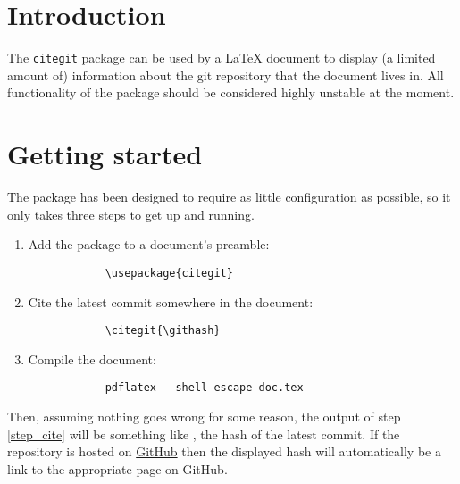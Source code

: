 \documentclass[12pt,a4paper]{article}
\begin{document}
	\section*{Introduction}
	The \verb+citegit+ package can be used by a \LaTeX{} document to display
	(a limited amount of) information about the git repository that the document
	lives in. All functionality of the package should be considered highly
	unstable at the moment.
	\section*{Getting started}
	The package has been designed to require as little configuration as possible,
	so it only takes three steps to get up and running.
	\begin{enumerate}
		\item
		\label{step_package}
		Add the package to a document's preamble:
		\begin{verbatim}
			\usepackage{citegit}
		\end{verbatim}
		\item
		\label{step_cite}
		Cite the latest commit somewhere in the document:
		\begin{verbatim}
			\citegit{\githash}
		\end{verbatim}
		\item
		\label{step_compile}
		Compile the document:
		\begin{verbatim}
			pdflatex --shell-escape doc.tex
		\end{verbatim}
	\end{enumerate}
	Then, assuming nothing goes wrong for some reason, the output of step
	\ref{step_cite} will be something like \citegit{\githash}, the hash of the
	latest commit. If the repository is hosted on \href{https://github.com}{GitHub}
	then the displayed hash will automatically be a link to the appropriate page
	on GitHub.

\end{document}
